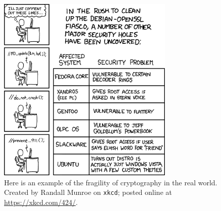 \begin{figure}[t]
\centering
    \includegraphics[width=0.75\textwidth]{figures/xkcd/xkcd_424_security_holes.png}
    \caption[\texttt{xkcd} Security Holes]{Here is an example
        of the fragility of cryptography in the real world.
        Created by Randall Munroe on \texttt{xkcd};
        posted online at \url{https://xkcd.com/424/}.
        }
    \label{fig:xkcd_security_holes}
\end{figure}
